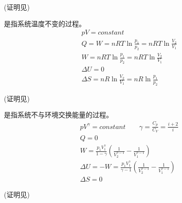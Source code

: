         (证明见)
        \begin{Itemize}
            \item {}是指系统温度不变的过程。
            \begin{equation}
                \begin{aligned}
                    &pV = constant \\
                    &Q = W = nRT\ln\frac{p_1}{p_2} = nRT\ln\frac{V_2}{V_1}\\
                    &W = nRT\ln\frac{p_1}{p_2} = nRT\ln\frac{V_2}{V_1} \\
                    &\Delta U = 0 \\ 
                    &\Delta S = nR\ln\frac{V_{2}}{V_{1}} =nR\ln\frac{p_{1}}{p_{2}}
                \end{aligned}
                \nonumber
            \end{equation}
        \end{Itemize}
        (证明见)
        \begin{Itemize}
            \item {}是指系统不与环境交换能量的过程。
            \begin{equation}
                \begin{aligned}
                    &pV^{\gamma} = constant \qquad \gamma = \frac{C_p}{C_V} = \frac{i+2}{i}\\
                    &Q = 0\\
                    &W = \frac{p_{1}V_{1}^{\gamma}}{1-\gamma}\left(\frac{1}{V_{2}^{\gamma-1}}-\frac{1}{V_1^{\gamma-1}}\right)\\
                    &\Delta U = -W =\frac{p_{1}V_{1}^{\gamma}}{\gamma - 1}\left(\frac{1}{V_{2}^{\gamma-1}}-\frac{1}{V_1^{\gamma-1}}\right)\\ 
                    &\Delta S = 0
                \end{aligned}
                \nonumber
            \end{equation}
        \end{Itemize}
        (证明见)
    \section[热力学第二定律]{}
